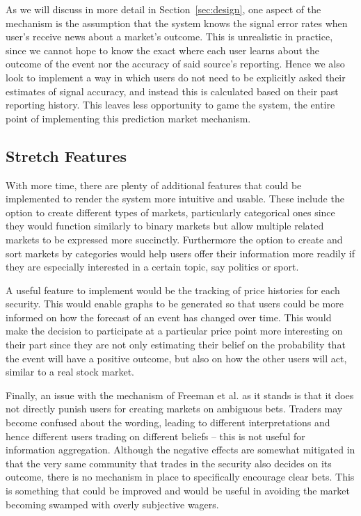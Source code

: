 As we will discuss in more detail in Section~\ref{sec:design}, one aspect of
the mechanism is the assumption that the system knows the signal error rates
when user's receive news about a market's outcome. This is unrealistic in
practice, since we cannot hope to know the exact where each user learns about
the outcome of the event nor the accuracy of said source's reporting. Hence we
also look to implement a way in which users do not need to be explicitly asked
their estimates of signal accuracy, and instead this is calculated based on
their past reporting history. This leaves less opportunity to game the system,
the entire point of implementing this prediction market mechanism.

\subsection{Stretch Features}

With more time, there are plenty of additional features that could be
implemented to render the system more intuitive and usable. These include the
option to create different types of markets, particularly categorical ones
since they would function similarly to binary markets but allow multiple
related markets to be expressed more succinctly. Furthermore the option to
create and sort markets by categories would help users offer their information
more readily if they are especially interested in a certain topic, say politics
or sport.

A useful feature to implement would be the tracking of price histories for each
security. This would enable graphs to be generated so that users could be more
informed on how the forecast of an event has changed over time. This would make
the decision to participate at a particular price point more interesting on
their part since they are not only estimating their belief on the probability
that the event will have a positive outcome, but also on how the other users
will act, similar to a real stock market.

Finally, an issue with the mechanism of Freeman et al. as it stands is that it
does not directly punish users for creating markets on ambiguous bets. Traders
may become confused about the wording, leading to different interpretations and
hence different users trading on different beliefs -- this is not useful for
information aggregation. Although the negative effects are somewhat mitigated
in that the very same community that trades in the security also decides on its
outcome, there is no mechanism in place to specifically encourage clear bets.
This is something that could be improved and would be useful in avoiding the
market becoming swamped with overly subjective wagers.

